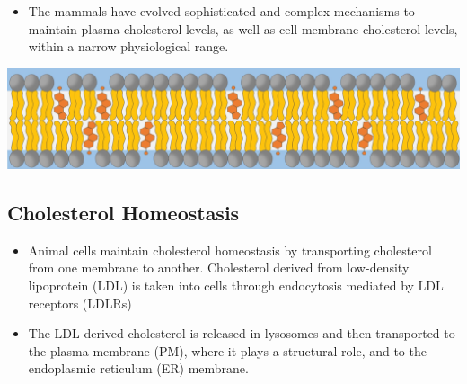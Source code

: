 \documentclass[10pt]{article}
\begin{document}
\begin{itemize}
    \item The mammals have evolved sophisticated and complex mechanisms to maintain plasma cholesterol levels, as well as cell membrane cholesterol levels, within a narrow physiological range.
\end{itemize}
\begin{center}
    \includegraphics*[width=\textwidth]{L4_5.png}
\end{center}

\subsection*{Cholesterol Homeostasis}
\begin{itemize}
    \item Animal cells maintain cholesterol homeostasis by transporting cholesterol from one membrane to another.  Cholesterol derived from low-density lipoprotein (LDL) is taken into cells through endocytosis mediated by LDL receptors (LDLRs)
    \item The LDL-derived cholesterol is released in lysosomes and then transported to the plasma membrane (PM), where it plays a structural role, and to the endoplasmic reticulum (ER) membrane.
\end{itemize}
\end{document}
